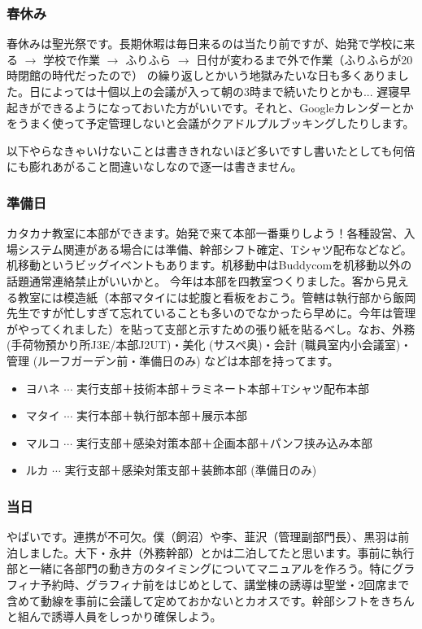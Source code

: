 \documentclass[dvipdfmx,jb5]{jarticle}
\begin{document}
\subsubsection{春休み}
春休みは聖光祭です。長期休暇は毎日来るのは当たり前ですが、始発で学校に来る $\longrightarrow$ 学校で作業 $\longrightarrow$ ふりふら $\longrightarrow$ 日付が変わるまで外で作業（ふりふらが20時閉館の時代だったので） の繰り返しとかいう地獄みたいな日も多くありました。日によっては十個以上の会議が入って朝の3時まで続いたりとかも... 遅寝早起きができるようになっておいた方がいいです。それと、Googleカレンダーとかをうまく使って予定管理しないと会議がクアドルプルブッキングしたりします。

以下やらなきゃいけないことは書ききれないほど多いですし書いたとしても何倍にも膨れあがること間違いなしなので逐一は書きません。

\subsubsection{準備日}
カタカナ教室に本部ができます。始発で来て本部一番乗りしよう！各種設営、入場システム関連がある場合には準備、幹部シフト確定、Tシャツ配布などなど。机移動というビッグイベントもあります。机移動中はBuddycomを机移動以外の話題通常連絡禁止がいいかと。
今年は本部を四教室つくりました。客から見える教室には模造紙（本部マタイには蛇腹と看板をおこう。管轄は執行部から飯岡先生ですが忙しすぎて忘れていることも多いのでなかったら早めに。今年は管理がやってくれました）を貼って支部と示すための張り紙を貼るべし。なお、外務 (手荷物預かり所J3E/本部J2UT)・美化 (サスペ奥)・会計 (職員室内小会議室)・管理 (ルーフガーデン前・準備日のみ) などは本部を持ってます。
\begin{itemize}
  \item ヨハネ $\cdots$ 実行支部＋技術本部＋ラミネート本部＋Tシャツ配布本部
  \item マタイ $\cdots$ 実行本部＋執行部本部＋展示本部
  \item マルコ $\cdots$ 実行支部＋感染対策本部＋企画本部＋パンフ挟み込み本部
  \item ルカ $\cdots$ 実行支部＋感染対策支部＋装飾本部 (準備日のみ)
\end{itemize}

\subsubsection{当日}
やばいです。連携が不可欠。僕（飼沼）や李、韮沢（管理副部門長）、黒羽は前泊しました。大下・永井（外務幹部）とかは二泊してたと思います。事前に執行部と一緒に各部門の動き方のタイミングについてマニュアルを作ろう。特にグラフィナ予約時、グラフィナ前をはじめとして、講堂棟の誘導は聖堂・2回席まで含めて動線を事前に会議して定めておかないとカオスです。幹部シフトをきちんと組んで誘導人員をしっかり確保しよう。
\end{document}
